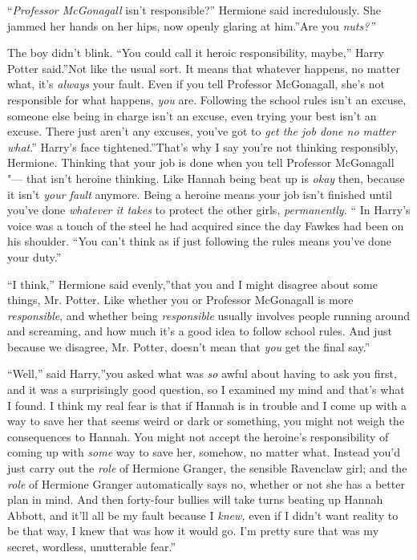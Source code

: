 ``\emph{Professor McGonagall} isn't responsible?'' Hermione said
incredulously. She jammed her hands on her hips, now openly glaring at
him.''Are you \emph{nuts?''}

The boy didn't blink. ``You could call it heroic responsibility,
maybe,'' Harry Potter said.''Not like the usual sort. It means that
whatever happens, no matter what, it's \emph{always} your fault. Even if
you tell Professor McGonagall, she's not responsible for what happens,
\emph{you} are. Following the school rules isn't an excuse, someone else
being in charge isn't an excuse, even trying your best isn't an excuse.
There just aren't any excuses, you've got to \emph{get the job done no
matter what}.'' Harry's face tightened.''That's why I say you're not
thinking responsibly, Hermione. Thinking that your job is done when you
tell Professor McGonagall "--- that isn't heroine thinking. Like Hannah
being beat up is \emph{okay} then, because it isn't \emph{your fault}
anymore. Being a heroine means your job isn't finished until you've done
\emph{whatever it takes} to protect the other girls, \emph{permanently.}
`` In Harry's voice was a touch of the steel he had acquired since the
day Fawkes had been on his shoulder. ``You can't think as if just
following the rules means you've done your duty.''

``I think,'' Hermione said evenly,''that you and I might disagree about
some things, Mr. Potter. Like whether you or Professor McGonagall is
more \emph{responsible}, and whether being \emph{responsible} usually
involves people running around and screaming, and how much it's a good
idea to follow school rules. And just because we disagree, Mr. Potter,
doesn't mean that \emph{you} get the final say.''

``Well,'' said Harry,''you asked what was \emph{so} awful about having
to ask you first, and it was a surprisingly good question, so I examined
my mind and that's what I found. I think my real fear is that if Hannah
is in trouble and I come up with a way to save her that seems weird or
dark or something, you might not weigh the consequences to Hannah. You
might not accept the heroine's responsibility of coming up with
\emph{some} way to save her, somehow, no matter what. Instead you'd just
carry out the \emph{role} of Hermione Granger, the sensible Ravenclaw
girl; and the \emph{role} of Hermione Granger automatically says no,
whether or not she has a better plan in mind. And then forty-four
bullies will take turns beating up Hannah Abbott, and it'll all be my
fault because I \emph{knew,} even if I didn't want reality to be that
way, I knew that was how it would go. I'm pretty sure that was my
secret, wordless, unutterable fear.''

